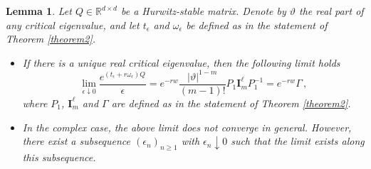 \documentclass[10pt,a4paper]{amsart}
\newtheorem{lemma}{Lemma}
\begin{document}
\begin{lemma}\label{Jordan} Let $Q\in\mathbb{R}^{d\times d}$ be a Hurwitz-stable matrix.  Denote by $\vartheta$  the real part of any critical eigenvalue, and let $t_\epsilon$  and  $\omega_\epsilon$ be defined as in the statement of Theorem \ref{theorem2}. \begin{itemize}
		\item[i)] If there is a unique real critical eigenvalue, then the following limit holds
		\[
		\lim_{\epsilon \downarrow 0} \frac{e^{(t_{\epsilon}+r\omega_\epsilon) Q}}{\epsilon}=e^{-rw}\frac{|\vartheta|^{1-m}}{(m-1)!} P_1\mathbf{I}^{\ell}_mP_1^{-1}=e^{-rw}\Gamma\,,
		\]
		where $P_1$, $\mathbf{I}^{\ell}_m$ and $\Gamma$ are defined as in the statement of Theorem \ref{theorem2}.
		\item[ii)] In the complex case, the above  limit does not converge in general. However, there exist a subsequence $(\epsilon_n)_{n\ge 1}$ with $\epsilon_n\downarrow 0$ such that the limit  exists along this subsequence.
	\end{itemize}
\end{lemma}
\end{document}
